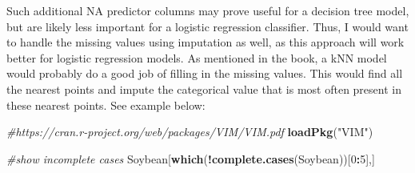 \documentclass[]{book}
\newenvironment{Shaded}{\begin{snugshade}}{\end{snugshade}}
\newcommand{\CommentTok}[1]{\textcolor[rgb]{0.56,0.35,0.01}{\textit{#1}}}
\newcommand{\DecValTok}[1]{\textcolor[rgb]{0.00,0.00,0.81}{#1}}
\newcommand{\KeywordTok}[1]{\textcolor[rgb]{0.13,0.29,0.53}{\textbf{#1}}}
\newcommand{\NormalTok}[1]{#1}
\newcommand{\OperatorTok}[1]{\textcolor[rgb]{0.81,0.36,0.00}{\textbf{#1}}}
\newcommand{\StringTok}[1]{\textcolor[rgb]{0.31,0.60,0.02}{#1}}
\begin{document}
Such additional NA predictor columns may prove useful for a decision tree model, but are likely less important for a logistic regression classifier. Thus, I would want to handle the missing values using imputation as well, as this approach will work better for logistic regression models. As mentioned in the book, a kNN model would probably do a good job of filling in the missing values. This would find all the nearest points and impute the categorical value that is most often present in these nearest points. See example below:

\begin{Shaded}
\begin{Highlighting}[]
\CommentTok{#https://cran.r-project.org/web/packages/VIM/VIM.pdf}
\KeywordTok{loadPkg}\NormalTok{(}\StringTok{"VIM"}\NormalTok{)}

\CommentTok{#show incomplete cases}
\NormalTok{Soybean[}\KeywordTok{which}\NormalTok{(}\OperatorTok{!}\KeywordTok{complete.cases}\NormalTok{(Soybean))[}\DecValTok{0}\OperatorTok{:}\DecValTok{5}\NormalTok{],]}
\end{Highlighting}
\end{Shaded}
\end{document}
